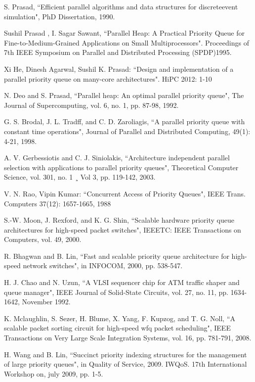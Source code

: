 \documentclass[10pt, conference, compsocconf]{IEEEtran}
\begin{document}
\begin{thebibliography}{1}

S. Prasad, ``Efficient parallel algorithms and data structures for discreteevent
simulation", PhD Dissertation, 1990.

 Sushil Prasad , I. Sagar Sawant, ``Parallel Heap: A Practical Priority Queue for Fine-to-Medium-Grained Applications on Small Multiprocessors". Proceedings of 7th IEEE Symposium on Parallel and Distributed Processing (SPDP)1995.

	Xi He, Dinesh Agarwal, Sushil K. Prasad: ``Design and implementation of a parallel priority queue on many-core architectures". HiPC 2012: 1-10

 N. Deo and S. Prasad, ``Parallel heap: An optimal parallel priority queue", The Journal of Supercomputing, vol. 6, no. 1, pp. 87-98, 1992.

 G. S. Brodal, J. L. Tradff, and C. D. Zaroliagis, ``A parallel priority queue with constant time operations", Journal of Parallel and Distributed Computing, 49(1): 4-21, 1998.

 A. V. Gerbessiotis and C. J. Siniolakis, ``Architecture independent parallel selection with applications to parallel priority queues", Theoretical Computer Science, vol. 301, no. 1 ¸ Vol 3, pp. 119-142, 2003.

	V. N. Rao, Vipin Kumar: ``Concurrent Access of Priority Queues", IEEE Trans. Computers 37(12): 1657-1665, 1988


 S.-W. Moon, J. Rexford, and K. G. Shin, ``Scalable hardware priority queue architectures for high-speed
packet switches", IEEETC: IEEE Transactions on Computers, vol. 49, 2000.

 R. Bhagwan and B. Lin, ``Fast and scalable priority queue architecture for high-speed network switches", in INFOCOM, 2000, pp. 538-547.

 H. J. Chao and N. Uzun, ``A VLSI sequencer chip for ATM traffic shaper and queue manager", IEEE
Journal of Solid-State Circuits, vol. 27, no. 11, pp. 1634-1642, November 1992.

 K. Mclaughlin, S. Sezer, H. Blume, X. Yang, F. Kupzog, and T. G. Noll, ``A scalable packet sorting circuit for high-speed wfq packet scheduling", IEEE Transactions on Very Large Scale Integration Systems, vol. 16, pp. 781-791, 2008.

 H. Wang and B. Lin, ``Succinct priority indexing structures for the management of large priority queues", in Quality of Service, 2009. IWQoS. 17th International Workshop on, july 2009, pp. 1-5.


\end{thebibliography}
\end{document}
